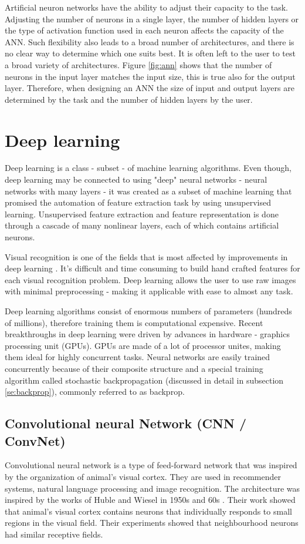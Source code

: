 \documentclass[times, utf8, diplomski]{fer}
\begin{document}
Artificial neuron networks have the ability to adjust their capacity to the task. Adjusting the number of neurons in a single layer, the number of hidden layers or the type of activation function used in each neuron affects the capacity of the ANN. Such flexibility also leads to a broad number of architectures, and there is no clear way to determine which one suits best. It is often left to the user to test a broad variety of architectures. Figure \ref{fig:ann} shows that the number of neurons in the input layer matches the input size, this is true also for the output layer. Therefore, when designing an ANN the size of input and output layers are determined by the task and the number of hidden layers by the user.


\section{Deep learning}
\label{se:deep_learning}
Deep learning is a class - subset - of machine learning algorithms. Even though, deep learning may be connected to using "deep" neural networks - neural networks with many layers - it was created as a subset of machine learning that promised the automation of feature extraction task by using unsupervised learning. Unsupervised feature extraction and feature representation is done through a cascade of many nonlinear layers, each of which contains artificial neurons. 

Visual recognition is one of the fields that is most affected by improvements in deep learning \citep{krizhevsky_imagenet_2012, simonyan_very_2014, szegedy_going_2015, he_deep_2016}. It's difficult and time consuming to build hand crafted features for each visual recognition problem. Deep learning allows the user to use raw images with minimal preprocessing - making it applicable with ease to almost any task.

Deep learning algorithms consist of enormous numbers of  parameters (hundreds of millions), therefore training them is computational expensive. Recent breakthroughs in deep learning were driven by advances in hardware - graphics processing unit (GPUs). GPUs are made of a lot of processor unites, making them ideal for highly concurrent tasks. Neural networks are easily trained concurrently because of their composite structure and a special training algorithm called stochastic backpropagation (discussed in detail in subsection \ref{se:backprop}), commonly referred to as backprop.

\subsection{Convolutional neural Network (CNN /  ConvNet)}
Convolutional neural network is a type of feed-forward network that was inspired by the organization of animal's visual cortex. They are used in recommender systems, natural language processing and image recognition. The architecture was inspired by the works of Huble and Wiesel in 1950s and 60s \citep{hubel_receptive_1968}. Their work showed that animal's visual cortex contains neurons that individually responds to small regions in the visual field. Their experiments showed that neighbourhood neurons had similar receptive fields.
\end{document}

